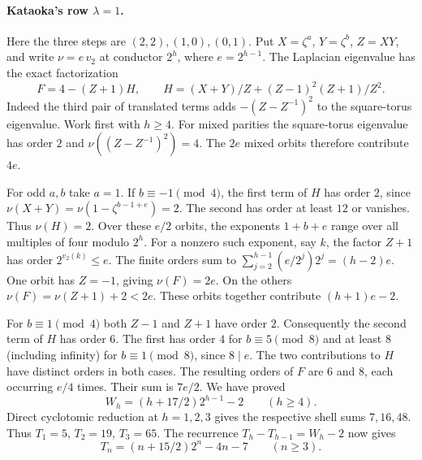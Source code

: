 \paragraph{Kataoka's row $\lambda=1$.}
Here the three steps are $(2,2),(1,0),(0,1)$. Put
$X=\zeta^a$, $Y=\zeta^b$, $Z=XY$, and write $\nu=e\,v_2$ at conductor
$2^h$, where $e=2^{h-1}$. The Laplacian eigenvalue has the exact factorization
\[
 F=4-(Z+1)H,\qquad
 H=(X+Y)/Z + (Z-1)^2(Z+1)/Z^2 .
\]
Indeed the third pair of translated terms adds $-(Z-Z^{-1})^2$ to the
square-torus eigenvalue. Work first with $h\ge4$.
For mixed parities the square-torus eigenvalue has order $2$ and
$\nu((Z-Z^{-1})^2)=4$. The $2e$ mixed orbits therefore contribute $4e$.

For odd $a,b$ take $a=1$. If $b\equiv-1\pmod4$, the first term of
$H$ has order $2$, since $\nu(X+Y)=\nu(1-\zeta^{b-1+e})=2$.
The second has order at least $12$ or vanishes. Thus $\nu(H)=2$.
Over these $e/2$ orbits, the exponents $1+b+e$ range over all multiples
of four modulo $2^h$. For a nonzero such exponent, say $k$, the factor
$Z+1$ has order $2^{v_2(k)}\le e$. The finite orders sum to
$\sum_{j=2}^{h-1}(e/2^j)2^j=(h-2)e$. One orbit has $Z=-1$, giving
$\nu(F)=2e$. On the others $\nu(F)=\nu(Z+1)+2<2e$. These orbits
together contribute $(h+1)e-2$.

For $b\equiv1\pmod4$ both $Z-1$ and $Z+1$ have order $2$.
Consequently the second term of $H$ has order $6$.
The first has order $4$ for $b\equiv5\pmod8$ and at least $8$
(including infinity) for $b\equiv1\pmod8$, since $8\mid e$.
The two contributions to $H$ have distinct orders in both cases.
The resulting orders of $F$ are $6$ and $8$, each occurring $e/4$
times. Their sum is $7e/2$. We have proved
\[
          W_h=(h+17/2)2^{h-1}-2\qquad(h\ge4).
\]
Direct cyclotomic reduction at $h=1,2,3$ gives the respective shell sums
$7,16,48$. Thus $T_1=5$, $T_2=19$, $T_3=65$. The recurrence
$T_h-T_{h-1}=W_h-2$ now gives
\[
             T_n=(n+15/2)2^n-4n-7\qquad(n\ge3).
\]
